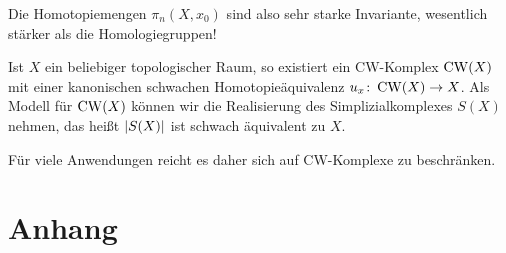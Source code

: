 \begin{bemerkung}[{name=[Homotopiemengen als Invariante]}]
	Die Homotopiemengen $\pi_n(X,x_0)$ sind also sehr starke Invariante, wesentlich stärker als die Homologiegruppen!
\end{bemerkung}

\begin{bemerkung}[{name=[CW-Approximation]}]
	Ist $X$ ein beliebiger topologischer Raum, so existiert ein CW-Komplex $\CW(X)$ mit einer kanonischen schwachen Homotopieäquivalenz $u_x \colon \CW(X) \to X$.
	Als Modell für $\CW(X)$ können wir die Realisierung des Simplizialkomplexes $S(X)$ nehmen, das heißt $\abs*{S(X)}$ ist schwach äquivalent zu $X$.
\end{bemerkung}

\begin{bemerkung}[{name=[Beschränkung auf CW-Komplexe]}]
	Für viele Anwendungen reicht es daher sich auf CW-Komplexe zu beschränken.
\end{bemerkung}


\cleardoubleoddemptypage
{}
\setcounter{page}{1}
\cleardoubleoddemptypage
\appendix

\section{Anhang} %
\label{sec:anhang}

\printindex
\printbibliography
\listoffigures
\todototoc
{}

